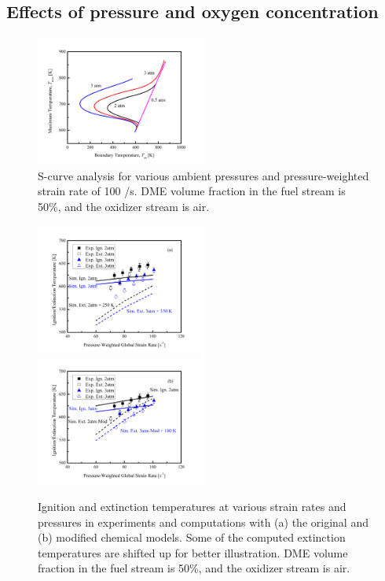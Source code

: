 \documentclass[review,3p,times]{elsarticle}
\begin{document}
\subsection{Effects of pressure and oxygen concentration}

\begin{figure}[t]
  \centering
  \scriptsize
  \includegraphics[trim=6.5mm 7.5mm 7mm 8mm, clip=true, width=0.5\textwidth]{eff_P.png}
  \normalsize
  \caption{S-curve analysis for various ambient pressures and pressure-weighted strain rate of 100 /s.  DME volume fraction in the fuel stream is 50\%, and the oxidizer stream is air.}
  \label{fig:eff_P}
\end{figure}

\begin{figure}[t]
  \centering
  \scriptsize
  \includegraphics[trim=6.5mm 7.5mm 7mm 8mm, clip=true, width=0.5\textwidth]{cmp_P.png}
  \includegraphics[trim=6.5mm 7.5mm 7mm 8mm, clip=true, width=0.5\textwidth]{cmp_P_mod.png}
  \normalsize
  \caption{Ignition and extinction temperatures at various strain rates and pressures in experiments and computations with (a) the original and (b) modified chemical models.  Some of the computed extinction temperatures are shifted up for better illustration.  DME volume fraction in the fuel stream is 50\%, and the oxidizer stream is air.}
  \label{fig:cmp_P}
\end{figure}
\end{document}

